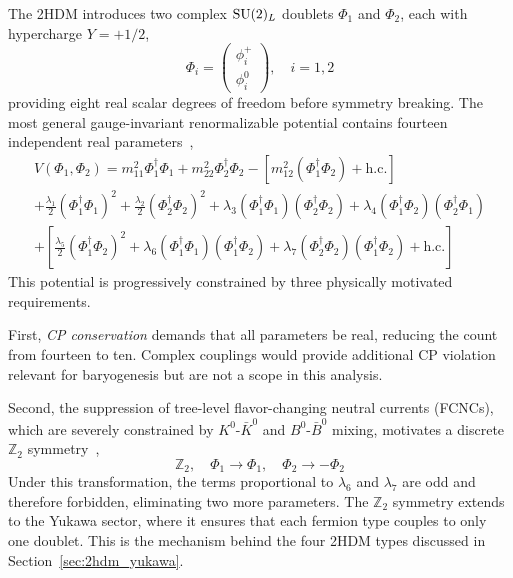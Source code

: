 The 2HDM introduces two complex $\mathrm{SU}(2)_L$ doublets $\Phi_1$ and $\Phi_2$, each with hypercharge $Y = +1/2$,
\begin{equation}
\Phi_i = \begin{pmatrix} \phi_i^+ \\ \phi_i^0 \end{pmatrix}, \quad i = 1,2
\end{equation}
providing eight real scalar degrees of freedom before symmetry breaking. The most general gauge-invariant renormalizable potential contains fourteen independent real parameters~\cite{Branco:2011iw,Gunion:1990dt},
\begin{gather}
V(\Phi_1, \Phi_2) = m_{11}^2 \Phi_1^\dagger\Phi_1 + m_{22}^2 \Phi_2^\dagger\Phi_2 - \left[m_{12}^2(\Phi_1^\dagger\Phi_2) + \text{h.c.}\right] \nonumber\\
+ \frac{\lambda_1}{2}(\Phi_1^\dagger\Phi_1)^2 + \frac{\lambda_2}{2}(\Phi_2^\dagger\Phi_2)^2 + \lambda_3(\Phi_1^\dagger\Phi_1)(\Phi_2^\dagger\Phi_2) + \lambda_4(\Phi_1^\dagger\Phi_2)(\Phi_2^\dagger\Phi_1) \nonumber\\
+ \left[\frac{\lambda_5}{2}(\Phi_1^\dagger\Phi_2)^2 + \lambda_6(\Phi_1^\dagger\Phi_1)(\Phi_1^\dagger\Phi_2) + \lambda_7(\Phi_2^\dagger\Phi_2)(\Phi_1^\dagger\Phi_2) + \text{h.c.}\right]
\label{eq:2hdm_potential_general}
\end{gather}
This potential is progressively constrained by three physically motivated requirements.

First, \emph{CP conservation} demands that all parameters be real, reducing the count from fourteen to ten. Complex couplings would provide additional CP violation relevant for baryogenesis but are not a scope in this analysis.

Second, the suppression of tree-level flavor-changing neutral currents (FCNCs), which are severely constrained by $K^0$-$\bar{K}^0$ and $B^0$-$\bar{B}^0$ mixing, motivates a discrete $\mathbb{Z}_2$ symmetry~\cite{Branco:2011iw},
\begin{equation}
\mathbb{Z}_2,\quad \Phi_1 \to \Phi_1, \quad \Phi_2 \to -\Phi_2
\label{eq:z2_symmetry}
\end{equation}
Under this transformation, the terms proportional to $\lambda_6$ and $\lambda_7$ are odd and therefore forbidden, eliminating two more parameters. The $\mathbb{Z}_2$ symmetry extends to the Yukawa sector, where it ensures that each fermion type couples to only one doublet. This is the mechanism behind the four 2HDM types discussed in Section~\ref{sec:2hdm_yukawa}.

